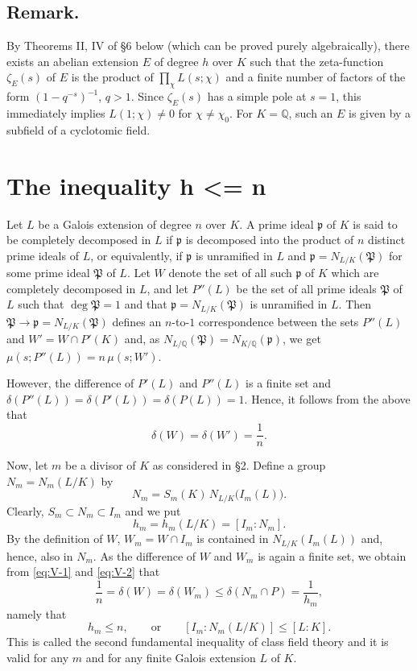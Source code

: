 \subsection*{Remark.}
By Theorems II, IV of §6 below (which can be proved purely
algebraically), there exists an abelian extension $E$ of degree $h$ over
$K$ such that the zeta-function $\zeta_{E}(s)$ of $E$ is the product of
$\prod_{\chi}L(s;\chi)$ and a finite number of factors of the form
$(1-q^{-s})^{-1}$, $q>1$. Since $\zeta_{E}(s)$ has a simple pole at
$s=1$, this immediately implies $L(1;\chi)\neq 0$ for $\chi\neq\chi_{0}$.
For $K=\mathbb{Q}$, such an $E$ is given by a subfield of a cyclotomic
field.

\section{The inequality h <= n}\label{sec:V-inequality}

Let $L$ be a Galois extension of degree $n$ over $K$. A prime ideal
$\mathfrak{p}$ of $K$ is said to be completely decomposed in $L$ if
$\mathfrak{p}$ is decomposed into the product of $n$ distinct prime
ideals of $L$, or equivalently, if $\mathfrak{p}$ is unramified in $L$
and $\mathfrak{p}=N_{L/K}(\mathfrak{P})$ for some prime ideal
$\mathfrak{P}$ of $L$. Let $W$ denote the set of all such
$\mathfrak{p}$ of $K$ which are completely decomposed in $L$, and let
$P''(L)$ be the set of all prime ideals $\mathfrak{P}$ of $L$ such that
$\deg\mathfrak{P}=1$ and that $\mathfrak{p}=N_{L/K}(\mathfrak{P})$ is
unramified in $L$. Then
$\mathfrak{P}\longrightarrow\mathfrak{p}=N_{L/K}(\mathfrak{P})$ defines
an $n$-to-$1$ correspondence between the sets $P''(L)$ and
$W'=W\cap P'(K)$ and, as
$N_{L/\mathbb{Q}}(\mathfrak{P})=N_{K/\mathbb{Q}}(\mathfrak{p})$, we get
$\mu(s;P''(L))=n\,\mu(s;W')$.

However, the difference of $P'(L)$ and $P''(L)$ is a finite set and
$\delta(P''(L))=\delta(P'(L))=\delta(P(L))=1$. Hence, it follows from the
above that
\[
\delta(W)=\delta(W')=\frac{1}{n}.
\tag{2}\label{eq:V-2}
\]

Now, let $m$ be a divisor of $K$ as considered in §2. Define a group
$N_{m}=N_{m}(L/K)$ by
\[
N_{m}=S_{m}(K)\,N_{L/K}\bigl(I_{m}(L)\bigr).
\]
Clearly, $S_{m}\subset N_{m}\subset I_{m}$ and we put
\[
h_{m}=h_{m}(L/K)=[I_{m}:N_{m}].
\]
By the definition of $W$, $W_{m}=W\cap I_{m}$ is contained in
$N_{L/K}(I_{m}(L))$ and, hence, also in $N_{m}$. As the difference of $W$
and $W_{m}$ is again a finite set, we obtain from \eqref{eq:V-1} and
\eqref{eq:V-2} that
\[
\frac{1}{n}=\delta(W)=\delta(W_{m})
\leq\delta(N_{m}\cap P)=\frac{1}{h_{m}},
\]
namely that
\[
h_{m}\leq n,\qquad\text{or}\qquad
[I_{m}:N_{m}(L/K)]\leq[L:K].
\tag{3}\label{eq:V-3}
\]
This is called the second fundamental inequality of class field theory
and it is valid for any $m$ and for any finite Galois extension $L$ of
$K$.

